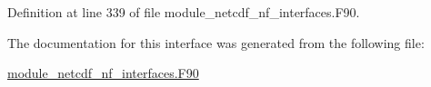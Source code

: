 Definition at line 339 of file module\+\_\+netcdf\+\_\+nf\+\_\+interfaces.\+F90.



The documentation for this interface was generated from the following file\+:\begin{DoxyCompactItemize}
\item 
\hyperlink{module__netcdf__nf__interfaces_8F90}{module\+\_\+netcdf\+\_\+nf\+\_\+interfaces.\+F90}\end{DoxyCompactItemize}
